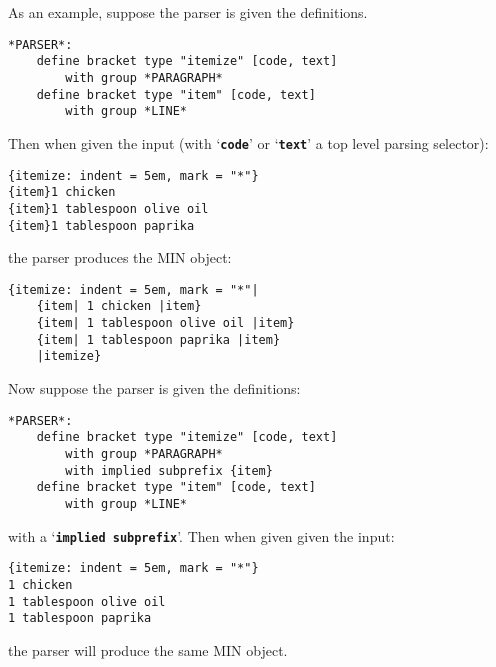 \documentclass[12pt]{article}
\newcommand{\TT}[1]{{\tt \bfseries #1}}
\newenvironment{indpar}[1][0.3in]%
	{\begin{list}{}%
		     {\setlength{\itemsep}{0in}%
		      \setlength{\topsep}{0in}%
		      \setlength{\parsep}{1ex}%
		      \setlength{\labelwidth}{#1}%
		      \setlength{\leftmargin}{#1}%
		      \addtolength{\leftmargin}{\labelsep}}%
	 \item}%
	{\end{list}}
\begin{document}
As an example, suppose the parser is given the definitions.
\begin{indpar}\begin{verbatim}
*PARSER*:
    define bracket type "itemize" [code, text]
        with group *PARAGRAPH*
    define bracket type "item" [code, text]
        with group *LINE*
\end{verbatim}\end{indpar}
Then when given the input (with `\TT{code}' or `\TT{text}'
a top level parsing selector):
\begin{indpar}\begin{verbatim}
{itemize: indent = 5em, mark = "*"}
{item}1 chicken
{item}1 tablespoon olive oil
{item}1 tablespoon paprika
\end{verbatim}\end{indpar}
the parser produces the MIN object:
\begin{indpar}\begin{verbatim}
{itemize: indent = 5em, mark = "*"|
    {item| 1 chicken |item}
    {item| 1 tablespoon olive oil |item}
    {item| 1 tablespoon paprika |item}
    |itemize}
\end{verbatim}\end{indpar}

Now suppose the parser is given the definitions:
\begin{indpar}\begin{verbatim}
*PARSER*:
    define bracket type "itemize" [code, text]
        with group *PARAGRAPH*
        with implied subprefix {item}
    define bracket type "item" [code, text]
        with group *LINE*
\end{verbatim}\end{indpar}
with a `\TT{implied subprefix}'.  Then when given given the input:
\begin{indpar}\begin{verbatim}
{itemize: indent = 5em, mark = "*"}
1 chicken
1 tablespoon olive oil
1 tablespoon paprika
\end{verbatim}\end{indpar}
the parser will produce the same MIN object.
\end{document}
